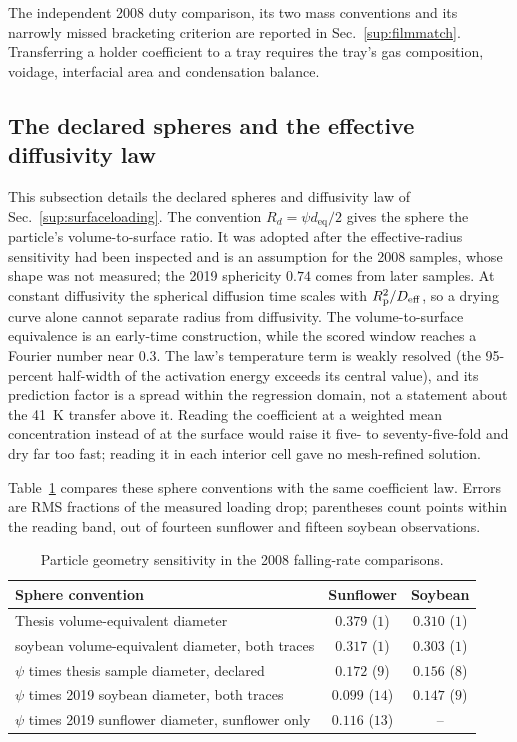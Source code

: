 The independent 2008 duty comparison, its two mass conventions and its
narrowly missed bracketing criterion are reported in Sec.~\ref{sup:filmmatch}.
Transferring a holder coefficient to a tray requires the tray's gas
composition, voidage, interfacial area and condensation balance.

\subsection{The declared spheres and the effective diffusivity law}
\label{sup:detail:spheres}
This subsection details the declared spheres and diffusivity law of Sec.~\ref{sup:surfaceloading}. The convention $R_d=\psi d_{\mathrm{eq}}/2$ gives the sphere the particle's volume-to-surface ratio. It was adopted after the effective-radius sensitivity had been inspected and is an assumption for the 2008 samples, whose shape was not measured; the 2019 sphericity $0.74$ comes from later samples. At constant diffusivity the spherical diffusion time scales with $R_{\mathrm{p}}^2/D_{\mathrm{eff}}$, so a drying curve alone cannot separate radius from diffusivity. The volume-to-surface equivalence is an early-time construction, while the scored window reaches a Fourier number near $0.3$. The law's temperature term is weakly resolved (the 95-percent half-width of the activation energy exceeds its central value), and its prediction factor is a spread within the regression domain, not a statement about the \SI{41}{\kelvin} transfer above it. Reading the coefficient at a weighted mean concentration instead of at the surface would raise it five- to seventy-five-fold and dry far too fast; reading it in each interior cell gave no mesh-refined solution.

Table~\ref{tab:detail:geometry} compares these sphere conventions with
the same coefficient law. Errors are RMS fractions of the measured loading
drop; parentheses count points within the reading band, out of fourteen sunflower and fifteen soybean observations.

\begin{table}[htbp]\centering\footnotesize
\caption{Particle geometry sensitivity in the 2008 falling-rate comparisons.}
\label{tab:detail:geometry}
\begin{tabular}{@{}>{\raggedright\arraybackslash}p{}cc@{}}\toprule
Sphere convention & Sunflower & Soybean\\\midrule
Thesis volume-equivalent diameter & $0.379$ ($1$) & $0.310$ ($1$)\\
2019 soybean volume-equivalent diameter, both traces & $0.317$ ($1$) & $0.303$ ($1$)\\
$\psi$ times thesis sample diameter, declared & $0.172$ ($9$) & $0.156$ ($8$)\\
$\psi$ times 2019 soybean diameter, both traces & $0.099$ ($14$) & $0.147$ ($9$)\\
$\psi$ times 2019 sunflower diameter, sunflower only & $0.116$ ($13$) & --\\
\bottomrule\end{tabular}\end{table}

